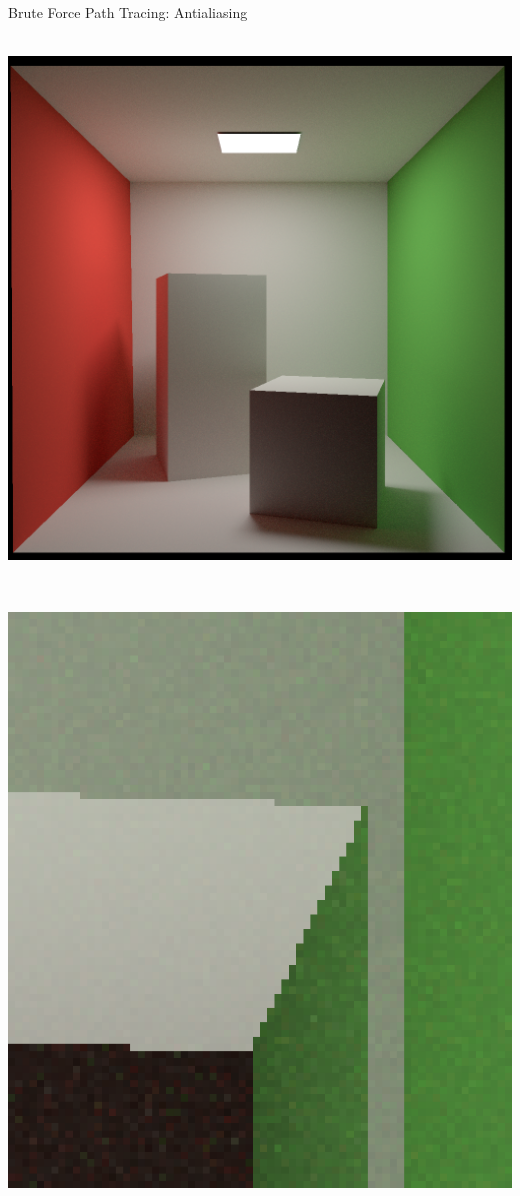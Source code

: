 \documentclass[utf8,stillsansserifmath,fleqn,t]{beamer}
\begin{document}
\begin{frame}
\frametitle{\insertsection}
Brute Force Path Tracing: Antialiasing\\
~\\
\begin{minipage}{.25\textwidth}
\includegraphics[width=\textwidth]{./fig/cornellbox-antialiasing-off.png}
\end{minipage}~~~~
\begin{minipage}{.21\textwidth}
\includegraphics[width=\textwidth]{./fig/cornellbox-antialiasing-off-cutout.png}

\end{minipage}
\end{frame}
\end{document}
